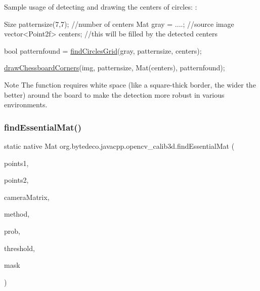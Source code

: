 Sample usage of detecting and drawing the centers of circles\+: \+: 
\begin{DoxyPre}
\begin{DoxyCode}
Size patternsize(7,7); \textcolor{comment}{//number of centers}
Mat gray = ....; \textcolor{comment}{//source image}
vector<Point2f> centers; \textcolor{comment}{//this will be filled by the detected centers}

\textcolor{keywordtype}{bool} patternfound = \hyperlink{group__calib3d_ga150470ce16ca1879fd1809729801803b}{findCirclesGrid}(gray, patternsize, centers);

\hyperlink{group__calib3d_ga71d497eb4a9eead84d1e4522d54ed580}{drawChessboardCorners}(img, patternsize, Mat(centers), patternfound);
\end{DoxyCode}
 \end{DoxyPre}
 \begin{DoxyNote}{Note}
The function requires white space (like a square-\/thick border, the wider the better) around the board to make the detection more robust in various environments. 
\end{DoxyNote}
\mbox{\label{group__calib3d_gad86954f592d1f99b0f8cdec7f4134c7a}} 
\subsubsection{\texorpdfstring{find\+Essential\+Mat()}{findEssentialMat()}\hspace{0.1cm}{\footnotesize\ttfamily [1/2]}}
{\footnotesize\ttfamily static native Mat org.\+bytedeco.\+javacpp.\+opencv\+\_\+calib3d.\+find\+Essential\+Mat (\begin{DoxyParamCaption}\item[{@By\+Val Mat}]{points1,  }\item[{@By\+Val Mat}]{points2,  }\item[{@By\+Val Mat}]{camera\+Matrix,  }\item[{int}]{method,  }\item[{double}]{prob,  }\item[{double}]{threshold,  }\item[{@By\+Val(null\+Value=\char`\"{}cv\+::\+Output\+Array(cv\+::no\+Array())\char`\"{}) Mat}]{mask }\end{DoxyParamCaption})\hspace{0.3cm}{\ttfamily [static]}}



